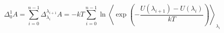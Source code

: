 


\[ \Delta_0^1 A = \sum_{i=0}^{n-1} \Delta_{\lambda_i}^{\lambda_{i+1}} A =
- kT \sum_{i=0}^{n-1} \ln \left< \exp \left( - \frac{U(\lambda_{i+1}) -
      U(\lambda_i)}{kT} \right) \right>_{\lambda_i} \]


